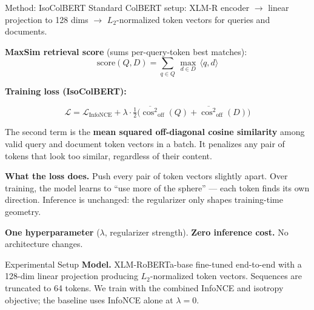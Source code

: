 \documentclass[20pt]{extarticle}
\newcommand{\callout}{\fontsize{18}{23}\selectfont}
\begin{document}
\begin{minipage}[t]{0.315\linewidth}
\vspace{10pt}

\begin{sectionbox}{Method: IsoColBERT}
Standard ColBERT setup: XLM-R encoder $\rightarrow$ linear projection to 128 dims $\rightarrow$ $L_2$-normalized token vectors for queries and documents.

\vspace{6pt}
\textbf{MaxSim retrieval score} (sums per-query-token best matches):
\[
\text{score}(Q,D) = \sum_{q \in Q}\,\max_{d \in D}\, \langle q, d\rangle
\]

\vspace{4pt}
\textbf{Training loss (IsoColBERT):}
\begin{tcolorbox}[enhanced, colback=white, colframe=accent, boxrule=1.2pt, arc=3pt,
  left=14pt, right=14pt, top=8pt, bottom=8pt]
\[
\mathcal{L} = \mathcal{L}_{\text{InfoNCE}} + \lambda \cdot \tfrac{1}{2}\Big(\overline{\cos^2}_{\text{off}}(Q) + \overline{\cos^2}_{\text{off}}(D)\Big)
\]
\end{tcolorbox}

\vspace{4pt}
The second term is the \textbf{mean squared off-diagonal cosine similarity} among valid query and document token vectors in a batch. It penalizes any pair of tokens that look too similar, regardless of their content.

\begin{intuitionbox}
\callout
\textbf{What the loss does.} Push every pair of token vectors slightly apart. Over training, the model learns to ``use more of the sphere'' --- each token finds its own direction. Inference is unchanged: the regularizer only shapes training-time geometry.
\end{intuitionbox}

\vspace{4pt}
\textbf{One hyperparameter} ($\lambda$, regularizer strength). \textbf{Zero inference cost.} No architecture changes.
\end{sectionbox}

\vspace{10pt}

\begin{sectionbox}{Experimental Setup}
\textbf{Model.} XLM-RoBERTa-base fine-tuned end-to-end with a 128-dim linear projection producing $L_2$-normalized token vectors. Sequences are truncated to 64 tokens. We train with the combined InfoNCE and isotropy objective; the baseline uses InfoNCE alone at $\lambda{=}0$.


\end{sectionbox}
\end{minipage}
\end{document}
